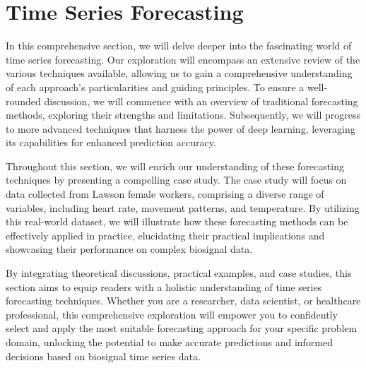 \documentclass[../main.tex]{subfiles}
\begin{document}
    \section{Time Series Forecasting}
        In this comprehensive section, we will delve deeper into the fascinating world of time series forecasting. Our exploration will encompass an extensive review of the various techniques available, allowing us to gain a comprehensive understanding of each approach's particularities and guiding principles. To ensure a well-rounded discussion, we will commence with an overview of traditional forecasting methods, exploring their strengths and limitations. Subsequently, we will progress to more advanced techniques that harness the power of deep learning, leveraging its capabilities for enhanced prediction accuracy. \par

        Throughout this section, we will enrich our understanding of these forecasting techniques by presenting a compelling case study. The case study will focus on data collected from Lawson female workers, comprising a diverse range of variables, including heart rate, movement patterns, and temperature. By utilizing this real-world dataset, we will illustrate how these forecasting methods can be effectively applied in practice, elucidating their practical implications and showcasing their performance on complex biosignal data. \par
        
        By integrating theoretical discussions, practical examples, and case studies, this section aims to equip readers with a holistic understanding of time series forecasting techniques. Whether you are a researcher, data scientist, or healthcare professional, this comprehensive exploration will empower you to confidently select and apply the most suitable forecasting approach for your specific problem domain, unlocking the potential to make accurate predictions and informed decisions based on biosignal time series data.\par

        
        
\end{document}
